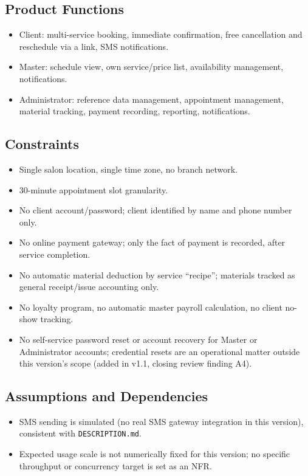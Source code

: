 \documentclass[11pt,a4paper]{article}
\begin{document}
\subsection{Product Functions}
\begin{itemize}[leftmargin=1.2cm]
  \item Client: multi-service booking, immediate confirmation, free
    cancellation and reschedule via a link, SMS notifications.
  \item Master: schedule view, own service/price list, availability
    management, notifications.
  \item Administrator: reference data management, appointment management,
    material tracking, payment recording, reporting, notifications.
\end{itemize}

\subsection{Constraints}
\label{sec:constraints}
\begin{itemize}[leftmargin=1.2cm]
  \item Single salon location, single time zone, no branch network.
  \item 30-minute appointment slot granularity.
  \item No client account/password; client identified by name and phone
    number only.
  \item No online payment gateway; only the fact of payment is recorded,
    after service completion.
  \item No automatic material deduction by service ``recipe''; materials
    tracked as general receipt/issue accounting only.
  \item No loyalty program, no automatic master payroll calculation, no
    client no-show tracking.
  \item No self-service password reset or account recovery for Master or
    Administrator accounts; credential resets are an operational matter
    outside this version's scope (added in v1.1, closing review finding A4).
\end{itemize}

\subsection{Assumptions and Dependencies}
\begin{itemize}[leftmargin=1.2cm]
  \item SMS sending is simulated (no real SMS gateway integration in this
    version), consistent with \texttt{DESCRIPTION.md}.
  \item Expected usage scale is not numerically fixed for this version; no
    specific throughput or concurrency target is set as an NFR.
\end{itemize}
\end{document}
